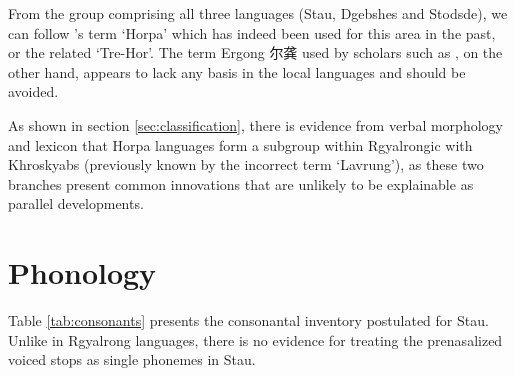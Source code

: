 \documentclass[oneside,a4paper,11pt]{article}
\newcommand{\zh}[1]{{\cn #1}}
\begin{document}
From the group comprising all three languages (Stau, Dgebshes and Stodsde),  we can follow 
\citet{jackson00sidaba}'s term `Horpa' which has indeed been used for this area in the past, or the related `Tre-Hor'.  The term Ergong \zh{尔龚} used by scholars such as \citet{sun83liujiang}, on the other hand, appears to lack any basis in the local languages and should be avoided.
 
As shown in section \ref{sec:classification}, there is evidence from verbal morphology and lexicon that Horpa languages form a subgroup within Rgyalrongic with Khroskyabs (previously known by the incorrect term `Lavrung'), as these two branches present common innovations that are unlikely to be explainable as parallel developments.
 
\section{Phonology}
 
  Table \ref{tab:consonants} presents the consonantal inventory postulated for Stau. Unlike in Rgyalrong languages, there is no evidence for treating the prenasalized voiced stops as single phonemes in Stau.
  
 \begin{table}
 \caption{Consonantal phonemes in Stau} \label{tab:consonants}  \centering
\end{table}
\end{document}
